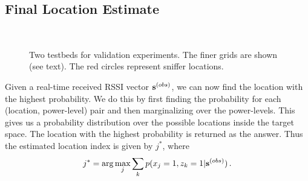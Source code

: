 \subsection{Final Location Estimate}
\label{subsec:finallocationestimate}

\begin{figure}
	\centering
		 \quad \quad \\
	\caption{Two testbeds for validation experiments. The finer grids are 
	shown (see text). The red circles represent sniffer locations.}
	\label{fig:experimenttestbed}
\end{figure}


Given a real-time received RSSI vector ${\bf {s}}^{(obs)}$, we can now
find the location with the highest probability. We do this by first
finding the probability for each (location, power-level) pair and then
marginalizing over the power-levels. This gives us a probability
distribution over the possible locations inside the target space. The
location with the highest probability is returned as the answer.
Thus the estimated location index is given by $j^{*}$, where
\begin{align}
j^{*} = \arg\max_{j} \sum_{k} p({x_{j}} = 1, {z_{k}} = 1 | {\bf {s}}^{(obs)}) \, .
\end{align}
